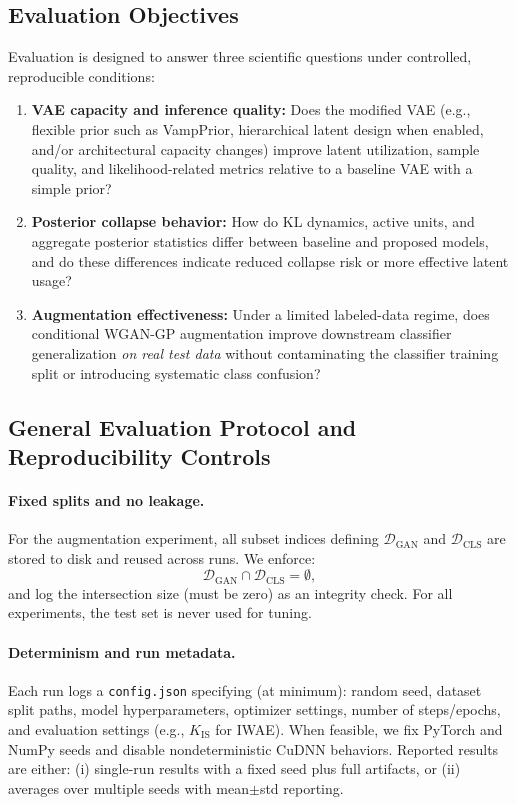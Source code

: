 
\subsection{Evaluation Objectives}
Evaluation is designed to answer three scientific questions under controlled, reproducible conditions:

\begin{enumerate}
  \item \textbf{VAE capacity and inference quality:}
  Does the modified VAE (e.g., flexible prior such as VampPrior, hierarchical latent design when enabled, and/or architectural capacity changes) improve latent utilization, sample quality, and likelihood-related metrics relative to a baseline VAE with a simple prior?

  \item \textbf{Posterior collapse behavior:}
  How do KL dynamics, active units, and aggregate posterior statistics differ between baseline and proposed models, and do these differences indicate reduced collapse risk or more effective latent usage?

  \item \textbf{Augmentation effectiveness:}
  Under a limited labeled-data regime, does conditional WGAN-GP augmentation improve downstream classifier generalization \emph{on real test data} without contaminating the classifier training split or introducing systematic class confusion?
\end{enumerate}

\subsection{General Evaluation Protocol and Reproducibility Controls}
\paragraph{Fixed splits and no leakage.}
For the augmentation experiment, all subset indices defining $\mathcal{D}_{\mathrm{GAN}}$ and $\mathcal{D}_{\mathrm{CLS}}$ are stored to disk and reused across runs. We enforce:
\[
\mathcal{D}_{\mathrm{GAN}} \cap \mathcal{D}_{\mathrm{CLS}} = \emptyset,
\]
and log the intersection size (must be zero) as an integrity check. For all experiments, the test set is never used for tuning.

\paragraph{Determinism and run metadata.}
Each run logs a \texttt{config.json} specifying (at minimum): random seed, dataset split paths, model hyperparameters, optimizer settings, number of steps/epochs, and evaluation settings (e.g., $K_{\mathrm{IS}}$ for IWAE). When feasible, we fix PyTorch and NumPy seeds and disable nondeterministic CuDNN behaviors. Reported results are either:
(i) single-run results with a fixed seed plus full artifacts, or
(ii) averages over multiple seeds with mean$\pm$std reporting.

